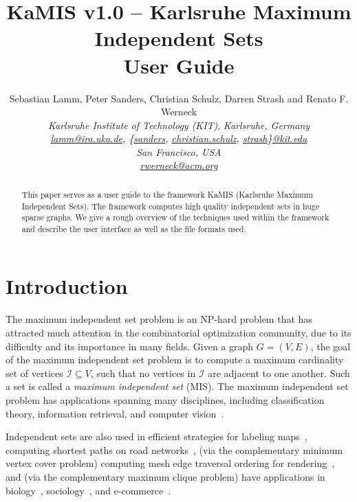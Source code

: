 \documentclass[11pt]{article}
\newif\ifFull
\newcommand{\mytitle}{ {\color{red}KaMIS} v1.0 -- {\color{red}Ka}rlsruhe {\color{red}M}aximum {\color{red}I}ndependent {\color{red}S}ets \\ User Guide}
\begin{document}
\title{\mytitle}
\author{Sebastian Lamm, Peter Sanders, Christian Schulz, Darren Strash and Renato F. Werneck\\ 
	\textit{Karlsruhe Institute of Technology (KIT)},
	\textit{Karlsruhe, Germany} \\
    \textit{\url{lamm@ira.uka.de}, \{\url{sanders}, \url{christian.schulz}, \url{strash}\}\url{@kit.edu}} \\
	\textit{San Francisco, USA} \\
    \textit{\url{rwerneck@acm.org}}}
\date{}

\maketitle
\begin{abstract}
This paper serves as a user guide to the framework KaMIS (Karlsruhe Maximum Independent Sets). 
The framework computes high quality independent sets in huge sparse graphs.
We give a rough overview of the techniques used within the framework and describe the user interface as well as the file formats used. 
\end{abstract}

\tableofcontents
\thispagestyle{empty}

\vfill
\pagebreak
\section{Introduction}
The maximum independent set problem is an NP-hard problem that has attracted much attention in the combinatorial optimization community, due to its difficulty and its importance in many fields. Given a graph $G=(V,E)$, the goal of the maximum independent set problem is to compute a maximum cardinality set of vertices $\mathcal{I}\subseteq V$, such that no vertices in $\mathcal{I}$ are adjacent to one another. Such a set is called a \emph{maximum independent set} (MIS). The maximum independent set problem has applications spanning many disciplines, including classification theory, information retrieval, and computer vision~\cite{feo1994greedy}.
\ifFull
As a concrete example, independent sets are vital in labeling strategies for maps~\cite{gemsa2014dynamiclabel}. Here, the objective is to maximize the number of visible non-overlapping labels on a map. 
In this example, the maximum independent set problem is solved in the label conflict graph, in which any two conflicting/overlapping labels are connected by an edge.
\else
Independent sets are also used in efficient strategies for labeling maps~\cite{gemsa2014dynamiclabel}, computing shortest paths on road networks~\cite{kieritz-contraction-2010}, (via the complementary minimum vertex cover problem) computing mesh edge traversal ordering for rendering~\cite{sander-mesh-2008}, and (via the complementary maximum clique problem) have applications in biology~\cite{gardiner-docking-2000}, sociology~\cite{harary-clique-1957}, and e-commerce~\cite{zaki-ecommerce-97}.
\fi
\end{document}
